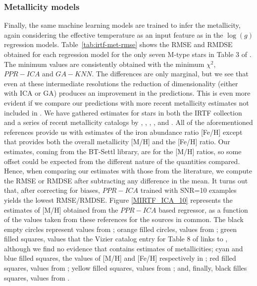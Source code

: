 \subsubsection{Metallicity models} 
\label{sect:irtf-met}
Finally, the same machine learning models are trained to infer the
metallicity, again considering the effective temperature as an input
feature as in the $\log(g)$ regression
models. Table~\ref{tab:irtf-met-rmse} shows the RMSE and RMDSE
obtained for each regression model for the only seven M-type stars in
Table 3 of \cite{cesetti}. The minimum values are consistently
obtained with the minimum $\chi^2$, $PPR-ICA$ and $GA-KNN$. The
differences are only marginal, but we see that even at these
intermediate resolutions the reduction of dimensionality (either with
ICA or GA) produces an improvement in the predictions. This is even
more evident if we compare our predictions with more recent
metallicity estimates not included in \cite{cesetti}. We have gathered
estimates for stars in both the IRTF collection and a series of recent
metallicity catalogs
by \cite{RA2012}, \cite{NevesIII}, \cite{Newton2014}, \cite{Gaidos2015},
and \cite{Mann2015}. All of the aforementioned references provide us
with estimates of the iron abundance ratio [Fe/H] except \cite{RA2012}
that provides both the overall metallicity [M/H] and the [Fe/H]
ratio. Our estimates, coming from the BT-Settl library, are for the
[M/H] ratios, so some offset could be expected from the different
nature of the quantities compared. Hence, when comparing our estimates
with those from the literature, we compute the RMSE or RMDSE after
subtracting any difference in the mean. It turns out that, after
correcting for biases, $PPR-ICA$ trained with SNR=10 examples yields
the lowest RMSE/RMDSE. Figure \ref{MIRTF_ICA_10} represents the
estimates of [M/H] obtained from the $PPR-ICA$ based regressor, as a
function of the values taken from these references for the sources in
common. The black empty circles represent values from \cite{cesetti} ;
orange filled circles, values from \cite{NevesIII}; green filled
squares, values that the Vizier catalog entry for Table 8 of
\cite{NevesIII} links to \cite{Jao}, although we find no evidence
that \cite{Jao} contains estimates of metallicities; cyan and blue
filled squares, the values of [M/H] and [Fe/H] respectively
in \cite{RA2012}; red filled squares, values from \cite{Mann2015};
yellow filled squares, values from \cite{Newton2014}; and, finally,
black filles squares, values from \cite{Gaidos2015}.

%
%

